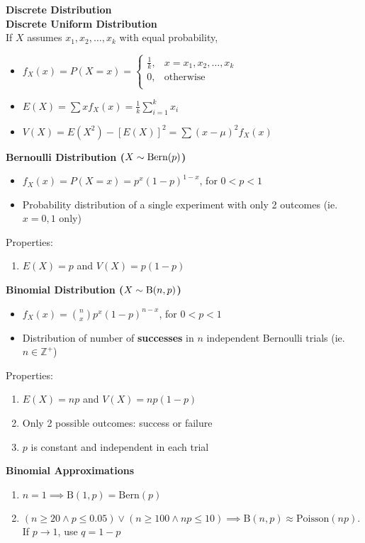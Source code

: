 \documentclass[a4paper, 12pt]{article}
\begin{document}
\begin{multicols*}{4}
\medskip

{\small\textbf{Discrete Distribution}} \\
\textbf{Discrete Uniform Distribution} \\
If $X$ assumes $x_1,x_2, \dots , x_k$ with equal probability,
\begin{itemize}
    \item $f_X(x) = P(X = x) = 
        \begin{cases}
            \frac{1}{k}, & x=x_1,x_2,\dots ,x_k \\
            0, & \text{otherwise} \\
        \end{cases}$
    \item $E(X) = \sum xf_X(x) = \frac{1}{k}\sum_{i=1}^{k}x_i$
    \item $V(X) = E(X^2) - [E(X)]^2 = \sum(x - \mu)^2f_X(x)$
\end{itemize}
\medskip
\textbf{Bernoulli Distribution ($X \sim \textnormal{Bern}(p)$)}
\begin{itemize}
    \item $f_X(x) = P(X=x) = p^x(1-p)^{1-x}$, for $0<p<1$
    \item Probability distribution of a single experiment with only 2 outcomes (ie. $x=0,1$ only)
\end{itemize}
Properties:
\begin{enumerate}
    \item $E(X) = p$ and $V(X) = p(1-p)$
\end{enumerate}
\textbf{Binomial Distribution ($X \sim \textnormal{B}(n,p)$)}
\begin{itemize}
    \item $f_X(x) = \binom{n}{x}p^x(1-p)^{n-x}$, for $0<p<1$
    \item Distribution of number of \textbf{successes} in $n$ independent Bernoulli trials (ie. $n \in \mathbb{Z}^+$)
\end{itemize}
Properties:
\begin{enumerate}
    \item $E(X) = np$ and $V(X) = np(1-p)$
    \item Only 2 possible outcomes: success or failure
    \item $p$ is constant and independent in each trial
\end{enumerate}
\textbf{Binomial Approximations}
\begin{enumerate}
    \item $n=1 \implies \text{B}(1,p) = \text{Bern}(p)$
    \item $(n \geq 20 \wedge p \leq 0.05) \vee (n \geq 100 \wedge np \leq 10) \implies \text{B}(n,p) \approx \text{Poisson}(np)$. If $p \rightarrow 1$, use $q = 1-p$

\end{enumerate}
\end{multicols*}
\end{document}
